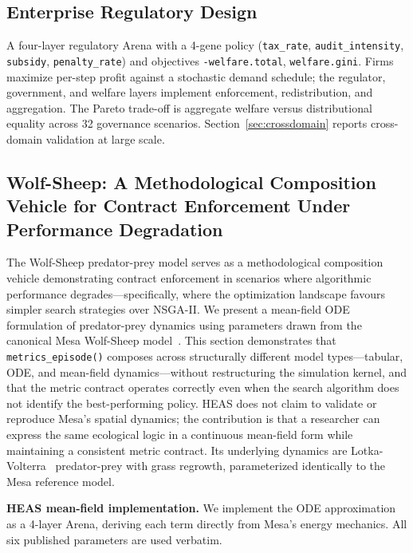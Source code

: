 \documentclass{wscpaperproc}
\begin{document}
\subsection{Enterprise Regulatory Design}

A four-layer regulatory Arena with a 4-gene policy
(\texttt{tax\_rate}, \texttt{audit\_intensity}, \texttt{subsidy},
\texttt{penalty\_rate}) and objectives \texttt{-welfare.total},
\texttt{welfare.gini}. Firms maximize per-step profit against a stochastic
demand schedule; the regulator, government, and welfare layers implement
enforcement, redistribution, and aggregation. The Pareto trade-off is
aggregate welfare versus distributional equality across 32 governance scenarios.
Section~\ref{sec:crossdomain} reports cross-domain validation at large scale.

\subsection{Wolf-Sheep: A Methodological Composition Vehicle for Contract Enforcement Under Performance Degradation}
\label{sec:wolfsheep}

The Wolf-Sheep predator-prey model serves as a methodological composition vehicle
demonstrating contract enforcement in scenarios where algorithmic performance
degrades---specifically, where the optimization landscape favours simpler search
strategies over NSGA-II.
We present a mean-field ODE formulation of predator-prey dynamics using
parameters drawn from the canonical Mesa Wolf-Sheep model~\cite{wilensky1997wolfsheep,kazil2020mesa}.
This section demonstrates that \texttt{metrics\_episode()} composes across
structurally different model types---tabular, ODE, and mean-field dynamics---without
restructuring the simulation kernel, and that the metric contract operates
correctly even when the search algorithm does not identify the best-performing
policy. HEAS does not claim to validate or reproduce Mesa's spatial dynamics;
the contribution is that a researcher can express the same ecological logic in a
continuous mean-field form while maintaining a consistent metric contract.
Its underlying dynamics are Lotka-Volterra~\cite{lotka1925elements,volterra1926variazioni} predator-prey with grass regrowth,
parameterized identically to the Mesa reference model.

\textbf{HEAS mean-field implementation.} We implement the ODE approximation as a
4-layer Arena, deriving each term directly from Mesa's energy mechanics.
All six published parameters are used verbatim.
\end{document}
